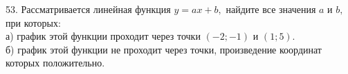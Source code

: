 53. Рассматривается линейная функция $y=ax+b,$ найдите все значения $a$ и $b,$ при которых:\\
а) график этой функции проходит через точки $(-2;-1)$ и $(1;5).$\\
б) график этой функции не проходит через точки, произведение координат которых положительно.\\
